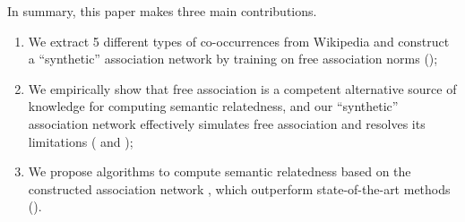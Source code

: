 In summary, this paper makes three main contributions.
\begin{enumerate}
\item We extract 5 different types of co-occurrences
from Wikipedia and construct a ``synthetic''
association network by training on free association norms ();
\item We empirically show that free association is a
competent alternative source of knowledge for computing semantic
relatedness, and our ``synthetic'' association network 
effectively simulates free association and resolves its limitations ( and 
);
\item We propose algorithms to compute semantic relatedness based on the constructed association network
, which outperform state-of-the-art methods
().
\end{enumerate}

